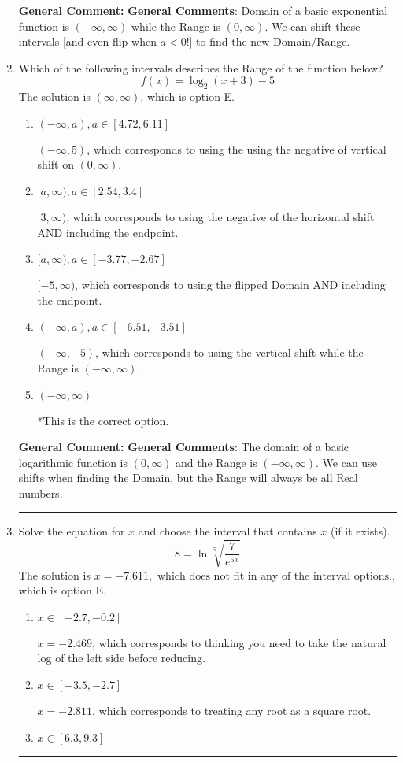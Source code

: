 \documentclass{extbook}[14pt]
\newcommand{\litem}[1]{\item #1

\rule{\textwidth}{0.4pt}}
\begin{document}
\begin{enumerate}
{\textbf{General Comment:} \textbf{General Comments}: Domain of a basic exponential function is $(-\infty, \infty)$ while the Range is $(0, \infty)$. We can shift these intervals [and even flip when $a<0$!] to find the new Domain/Range.
}
\litem{
Which of the following intervals describes the Range of the function below?
\[ f(x) = \log_2{(x+3)}-5 \]The solution is \( (\infty, \infty) \), which is option E.\begin{enumerate}[label=\Alph*.]
\item \( (-\infty, a), a \in [4.72, 6.11] \)

$(-\infty, 5)$, which corresponds to using the using the negative of vertical shift on $(0, \infty)$.
\item \( [a, \infty), a \in [2.54, 3.4] \)

$[3, \infty)$, which corresponds to using the negative of the horizontal shift AND including the endpoint.
\item \( [a, \infty), a \in [-3.77, -2.67] \)

$[-5, \infty)$, which corresponds to using the flipped Domain AND including the endpoint.
\item \( (-\infty, a), a \in [-6.51, -3.51] \)

$(-\infty, -5)$, which corresponds to using the vertical shift while the Range is $(-\infty, \infty)$.
\item \( (-\infty, \infty) \)

*This is the correct option.
\end{enumerate}

\textbf{General Comment:} \textbf{General Comments}: The domain of a basic logarithmic function is $(0, \infty)$ and the Range is $(-\infty, \infty)$. We can use shifts when finding the Domain, but the Range will always be all Real numbers.
}
\litem{
 Solve the equation for $x$ and choose the interval that contains $x$ (if it exists).
\[  8 = \ln{\sqrt[5]{\frac{7}{e^{5x}}}} \]The solution is \( x = -7.611, \text{ which does not fit in any of the interval options.} \), which is option E.\begin{enumerate}[label=\Alph*.]
\item \( x \in [-2.7, -0.2] \)

$x = -2.469$, which corresponds to thinking you need to take the natural log of the left side before reducing.
\item \( x \in [-3.5, -2.7] \)

$x = -2.811$, which corresponds to treating any root as a square root.
\item \( x \in [6.3, 9.3] \)


\end{enumerate}}
\end{enumerate}
\end{document}
